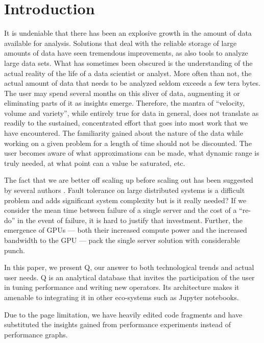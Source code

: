 \section{Introduction}

It is undeniable that there has been an explosive growth in the 
amount of data available for analysis. Solutions that 
deal with the reliable storage of large amounts of data have seen tremendous
improvements, as also tools to analyze large data sets. What has sometimes been
obscured is the understanding of the actual reality of the life of a data
scientist or analyst. More often than not, the actual amount of data that needs
to be analyzed seldom exceeds a few tera bytes\cite{Dittrich2015}. The user may spend
several months on this sliver of data, augmenting it or eliminating parts of it
as insights emerge. Therefore, the mantra of ``velocity, volume and variety'',
while entirely true for data in general, does not translate as readily to the
sustained, concentrated effort that goes into most work that we have
encountered. The familiarity gained about the nature of the data 
while working on a given problem for a length of time should not be discounted. The
user becomes aware of what approximations can be made, what dynamic range is
truly needed, at what point can a value be saturated, etc.

The fact that we are better off scaling up before scaling out has been suggested
by several authors \cite{Rowstron2012,Dittrich2015}. 
Fault tolerance on large distributed systems is a difficult
problem and adds significant system complexity but is it really needed?
If we consider the mean time between failure of a single server and
the cost of a ``re-do'' in the event of failure,
it is hard to justify that investment. 
Further, the emergence of GPUs --- both their increased compute power and the
increased  bandwidth to the GPU --- pack the single server solution with
considerable punch.

In this paper, we present Q, our answer to both technological trends and actual
user needs. Q is an analytical database that invites the participation of the
user in tuning performance and writing new operators. Its architecture makes it
amenable to integrating it in other eco-systems such as Jupyter notebooks.

Due to the page limitation, we have heavily edited code fragments and
have substituted the insights gained from performance experiments instead of
performance graphs.
